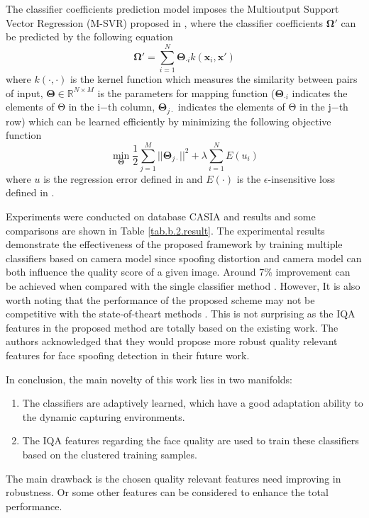 \documentclass[journal]{IEEEtran}
\begin{document}
The classifier coefficients prediction model imposes the Multioutput Support Vector Regression (M-SVR) proposed in \cite{tuia2011multioutput}, where the classifier coefficients $\mathbf{\Omega}'$ can be predicted by the following equation
\begin{equation}
    \mathbf{\Omega}' = \sum\limits_{i = 1} ^ N \mathbf{\Theta}_{\cdot i}k(\mathbf{x}_i,\mathbf{x}')
\end{equation}
where $k(\cdot,\cdot)$ is the kernel function which measures the similarity between pairs of input, $\mathbf{\Theta} \in \mathbb{R}^{N\times M}$ is the parameters for mapping function ($\mathbf{\Theta}_{\cdot i}$ indicates the elements of Θ in the i−th column, $\mathbf{\Theta}_{j\cdot}$ indicates the elements of Θ in the j−th row) which can be learned efficiently by minimizing the following objective function
\begin{equation}
    \min\limits_\mathbf{\Theta}\frac{1}{2}\sum\limits_{j=1}^M||\mathbf{\Theta}_{j\cdot}||^2+\lambda\sum\limits_{i=1}^NE(u_i)
\end{equation}
where $u$ is the regression error defined in \cite{tuia2011multioutput} and $E(\cdot)$ is the $\epsilon$-insensitive loss defined in \cite{tuia2011multioutput}.

Experiments were conducted on database CASIA \cite{zhang2012face} and results and some comparisons are shown in Table \ref{tab.b.2.result}. The experimental results demonstrate the effectiveness of the proposed framework by training multiple classifiers based on camera model since spoofing distortion and camera model can both influence the quality score of a given image. Around 7\% improvement can be achieved when compared with the single classifier method \cite{galbally2014image}. However, It is also worth noting that the performance of the proposed scheme may not be competitive with the state-of-theart methods \cite{maatta2011face}\cite{wen2015face}. This is not surprising as the IQA features in the proposed method are totally based on the existing work. The authors acknowledged that they would propose more robust quality relevant features for face spoofing detection in their future work.

In conclusion, the main novelty of this work lies in two manifolds:
\begin{enumerate}
\item The classifiers are adaptively learned, which have a good adaptation ability to the dynamic capturing environments.
\item  The IQA features regarding the face quality are used to train these classifiers based on the clustered training samples. 
\end{enumerate}
The main drawback is the chosen quality relevant features need improving in robustness. Or some other features can be considered to enhance the total performance.
\end{document}
